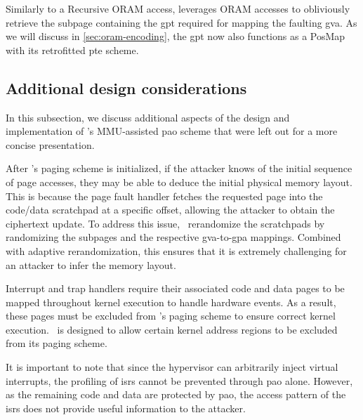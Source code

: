 Similarly to a Recursive ORAM access, \thename leverages ORAM accesses to obliviously retrieve the subpage containing the \gls{gpt} required for mapping the faulting \gls{gva}.
As we will discuss in \cref{sec:oram-encoding}, the \gls{gpt} now also functions as a PosMap with its retrofitted \gls{pte} scheme.





\subsection{Additional design considerations}
In this subsection, we discuss additional aspects of the design and implementation of \thename's MMU-assisted \gls{pao} scheme that were left out for a more concise presentation.

After \thename's paging scheme is initialized, if the attacker knows of the initial sequence of page accesses, they may be able to deduce the initial physical memory layout.
This is because the page fault handler fetches the requested page into the code/data scratchpad at a specific offset, allowing the attacker to obtain the ciphertext update.
To address this issue, \thename\ rerandomize the scratchpads by randomizing the subpages and the respective \gls{gva}-to-\gls{gpa} mappings.
Combined with adaptive rerandomization, this ensures that it is extremely challenging for an attacker to infer the memory layout.



Interrupt and trap handlers require their associated code and data pages to be mapped throughout kernel execution to handle hardware events.
As a result, these pages must be excluded from \thename's paging scheme to ensure correct kernel execution.
\thename\ is designed to allow certain kernel address regions to be excluded from its paging scheme.

It is important to note that since the hypervisor can arbitrarily inject virtual interrupts, the profiling of \glspl{isr} cannot be prevented through \gls{pao} alone.
However, as the remaining code and data are protected by \gls{pao}, the access pattern of the \glspl{isr} does not provide useful information to the attacker.

